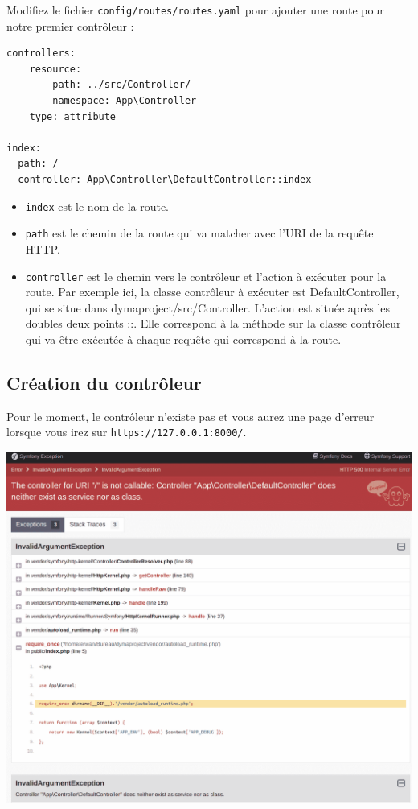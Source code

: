\documentclass{article}
\begin{document}
Modifiez le fichier {\tt config/routes/routes.yaml} pour ajouter une route pour notre premier contrôleur :
\begin{verbatim}
controllers:
    resource:
        path: ../src/Controller/
        namespace: App\Controller
    type: attribute

index:
  path: /
  controller: App\Controller\DefaultController::index
\end{verbatim}

\begin{itemize}
\item {\tt index} est le nom de la route.

\item {\tt path} est le chemin de la route qui va matcher avec l'URI de la requête HTTP.

\item {\tt controller} est le chemin vers le contrôleur et l'action à exécuter pour la route. Par exemple ici, la classe contrôleur à exécuter est DefaultController, qui se situe dans dymaproject/src/Controller. L'action est située après les doubles deux points ::. Elle correspond à la méthode sur la classe contrôleur qui va être exécutée à chaque requête qui correspond à la route.
\end{itemize}

\subsection{Création du contrôleur}
Pour le moment, le contrôleur n'existe pas et vous aurez une page d'erreur lorsque vous irez sur {\tt https://127.0.0.1:8000/}.

\begin{center}
\includegraphics[width=15cm]{images/image7.png}
\end{center}
\end{document}
